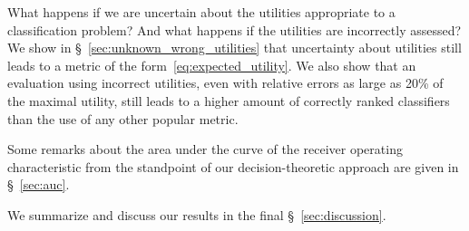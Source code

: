 \documentclass[\ifafour a4paper,12pt,\else a5paper,10pt,\fi%
onecolumn,oneside,article,%
british%
]{memoir}
\theoremstyle{remark}
\theoremstyle{innote}
\newcommand*{\wrench}{{\fontencoding{U}\fontfamily{fontawesomethree}\selectfont\symbol{114}}}
\newcommand{\mynotew}[1]{{\footnotesize\color{notecolour}\wrench\ #1}}
\renewcommand*{\|}[1][]{\nonscript\:#1\vert\nonscript\:\mathopen{}}
\newcommand*{\sect}{\S}%
\begin{document}
What happens if we are uncertain about the utilities appropriate to a classification problem? And what happens if the utilities are incorrectly assessed? We show in \sect~\ref{sec:unknown_wrong_utilities} that uncertainty about utilities still leads to a metric of the form~\eqref{eq:expected_utility}. We also show that an evaluation using incorrect utilities, even with relative errors as large as 20\% of the maximal utility, still leads to a higher amount of correctly ranked classifiers than the use of any other popular metric.

Some remarks about the area under the curve of the receiver operating characteristic from the standpoint of our decision-theoretic approach are given in \sect~\ref{sec:auc}.

We summarize and discuss our results in the final \sect~\ref{sec:discussion}.



\end{document}
